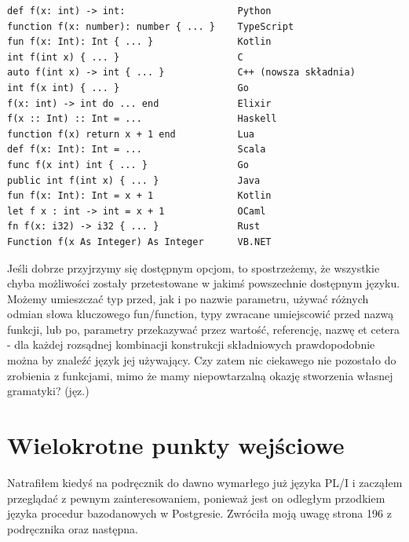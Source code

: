 \lstset{
    escapechar=@
    breaklines=true
}
\begin{lstlisting}
def f(x: int) -> int:               	 Python
function f(x: number): number { ... }    TypeScript
fun f(x: Int): Int { ... }          	 Kotlin
int f(int x) { ... }                	 C
auto f(int x) -> int { ... }        	 C++ (nowsza składnia)
int f(x int) { ... }                	 Go
f(x: int) -> int do ... end         	 Elixir
f(x :: Int) :: Int = ...            	 Haskell
function f(x) return x + 1 end      	 Lua
def f(x: Int): Int = ...            	 Scala
func f(x int) int { ... }           	 Go
public int f(int x) { ... }         	 Java
fun f(x: Int): Int = x + 1          	 Kotlin
let f x : int -> int = x + 1        	 OCaml
fn f(x: i32) -> i32 { ... }         	 Rust
Function f(x As Integer) As Integer 	 VB.NET
\end{lstlisting}
\lstset{
    escapechar=|,
    breaklines=true
}
Jeśli dobrze przyjrzymy się dostępnym opcjom, to spostrzeżemy, że wszystkie chyba możliwości zostały przetestowane w jakimś powszechnie dostępnym języku. Możemy umieszczać typ przed, jak i po nazwie parametru, używać różnych odmian słowa kluczowego fun/function, typy zwracane umiejscowić przed nazwą funkcji, lub po, parametry przekazywać przez wartość, referencję, nazwę et cetera - dla każdej rozsądnej kombinacji konstrukcji składniowych prawdopodobnie można by znaleźć język jej używający.
Czy zatem nic ciekawego nie pozostało do zrobienia z funkcjami, mimo że mamy niepowtarzalną okazję stworzenia własnej gramatyki? (jęz.) 

\section{Wielokrotne punkty wejściowe}
Natrafiłem kiedyś na podręcznik do dawno wymarłego już języka PL/I i zacząłem przeglądać z pewnym zainteresowaniem, ponieważ jest on odległym przodkiem języka procedur bazodanowych w Postgresie. Zwróciła moją uwagę strona 196 z podręcznika\cite{plif} oraz następna.

